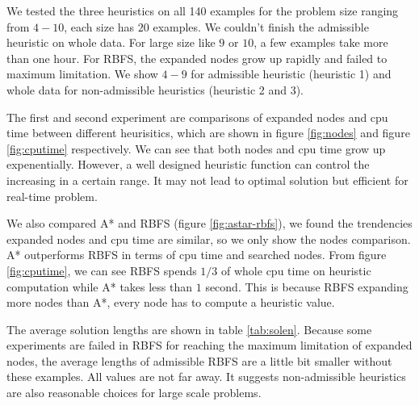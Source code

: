 We tested the three heuristics on all 140 examples for the problem size ranging from $4-10$, each size has $20$ examples. We couldn't finish the admissible heuristic on whole data. For large size like $9$ or $10$, a few examples take more than one hour. For RBFS, the expanded nodes grow up rapidly and failed to maximum limitation. We show $4-9$ for admissible heuristic (heuristic 1) and whole data for non-admissible heuristics (heuristic 2 and 3). 

The first and second experiment are comparisons of expanded nodes and cpu time between different heurisitics, which are shown in figure \ref{fig:nodes} and figure \ref{fig:cputime} respectively. We can see that both nodes and cpu time grow up expenentially. However, a well designed heuristic function can control the increasing in a certain range. It may not lead to optimal solution but efficient for real-time problem. 

We also compared A* and RBFS (figure \ref{fig:astar-rbfs}), we found the trendencies expanded nodes and cpu time are similar, so we only show the nodes comparison. A* outperforms RBFS in terms of cpu time and searched nodes. From figure \ref{fig:cputime}, we can see RBFS spends $1/3$ of whole cpu time on heuristic computation while A* takes less than $1$ second. This is because RBFS expanding more nodes than A*, every node has to compute a heuristic value.

The average solution lengths are shown in table \ref{tab:solen}. Because some experiments are failed in RBFS for reaching the maximum limitation of expanded nodes, the average lengths of admissible RBFS are a little bit smaller without these examples. All values are not far away. It suggests non-admissible heuristics are also reasonable choices for large scale problems.

